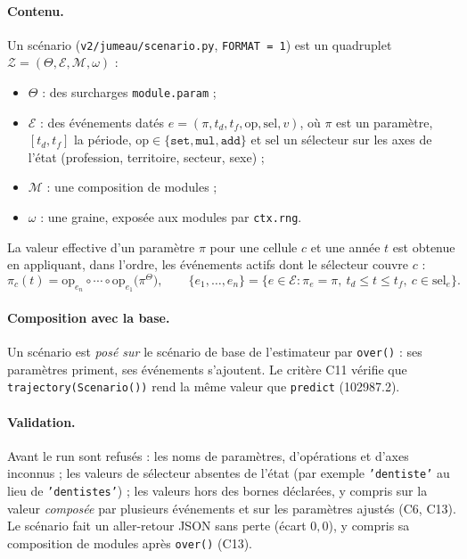 \paragraph{Contenu.} Un scénario (\texttt{v2/jumeau/scenario.py}, \texttt{FORMAT = 1}) est un quadruplet
$\mathcal{Z} = (\Theta, \mathcal{E}, \mathcal{M}, \omega)$ :
\begin{itemize}
  \item $\Theta$ : des surcharges \texttt{module.param} ;
  \item $\mathcal{E}$ : des événements datés $e = (\pi, t_d, t_f, \mathrm{op}, \mathrm{sel}, v)$, où $\pi$ est un
        paramètre, $[t_d, t_f]$ la période, $\mathrm{op} \in \{\texttt{set}, \texttt{mul}, \texttt{add}\}$ et
        $\mathrm{sel}$ un sélecteur sur les axes de l'état (profession, territoire, secteur, sexe) ;
  \item $\mathcal{M}$ : une composition de modules ;
  \item $\omega$ : une graine, exposée aux modules par \texttt{ctx.rng}.
\end{itemize}
La valeur effective d'un paramètre $\pi$ pour une cellule $c$ et une année $t$ est obtenue en appliquant, dans
l'ordre, les événements actifs dont le sélecteur couvre $c$ :
\begin{equation}\label{jum:eq:evenement}
  \pi_{c}(t) = \mathrm{op}_{e_n} \circ \cdots \circ \mathrm{op}_{e_1}\bigl(\pi^{\Theta}\bigr), \qquad
  \{e_1, \dots, e_n\} = \{e \in \mathcal{E} : \pi_e = \pi,\ t_d \le t \le t_f,\ c \in \mathrm{sel}_e\}.
\end{equation}

\paragraph{Composition avec la base.} Un scénario est \emph{posé sur} le scénario de base de l'estimateur par
\texttt{over()} : ses paramètres priment, ses événements s'ajoutent. Le critère C11 vérifie que
\texttt{trajectory(Scenario())} rend la même valeur que \texttt{predict} (\num{102987.2}\mesure{}).

\paragraph{Validation.} Avant le run sont refusés : les noms de paramètres, d'opérations et d'axes inconnus ; les
valeurs de sélecteur absentes de l'état (par exemple \texttt{'dentiste'} au lieu de \texttt{'dentistes'}) ; les
valeurs hors des bornes déclarées, y compris sur la valeur \emph{composée} par plusieurs événements et sur les
paramètres ajustés (C6, C13). Le scénario fait un aller-retour JSON sans perte (écart $0{,}0$\mesure{}), y compris
sa composition de modules après \texttt{over()} (C13).

